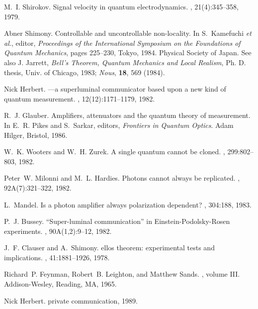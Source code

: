 \begin{thebibliography}{10}

M.~I. Shirokov.
\newblock Signal velocity in quantum electrodynamics.
, 21(4):345--358, 1979.

Abner Shimony.
\newblock Controllable and uncontrollable non-locality.
\newblock In S.~Kamefuchi {\it et al.}, editor, {\em Proceedings of the
  International Symposium on the Foundations of Quantum Mechanics}, pages
  225--230, Tokyo, 1984. Physical Society of Japan.
\newblock See also J. Jarrett, {\sl Bell's Theorem, Quantum Mechanics and Local
  Realism}, Ph. D. thesis, Univ. of Chicago, 1983; {\sl Nous}, {\bf 18}, 569
  (1984).

Nick Herbert.
---a superluminal communicator based upon a new kind of
  quantum measurement.
, 12(12):1171--1179, 1982.

R.~J. Glauber.
\newblock Amplifiers, attenuators and the quantum theory of measurement.
\newblock In E.~R. Pikes and S.~Sarkar, editors, {\em Frontiers in Quantum
  Optics}. Adam Hilger, Bristol, 1986.

W.~K. Wooters and W.~H. Zurek.
\newblock A single quantum cannot be cloned.
, 299:802--803, 1982.

Peter~W. Milonni and M.~L. Hardies.
\newblock Photons cannot always be replicated.
, 92A(7):321--322, 1982.

L.~Mandel.
\newblock Is a photon amplifier always polarization dependent?
, 304:188, 1983.

P.~J. Bussey.
\newblock ``Super-luminal communication'' in {E}instein-{P}odolsky-{R}osen
  experiments.
, 90A(1,2):9--12, 1982.

J.~F. Clauser and A.~Shimony.
ellos theorem: experimental tests and implications.
, 41:1881--1926, 1978.

Richard~P. Feynman, Robert~B. Leighton, and Matthew Sands.
, volume III.
\newblock Addison-Wesley, Reading, MA, 1965.

Nick Herbert.
\newblock private communication, 1989.

\end{thebibliography}

